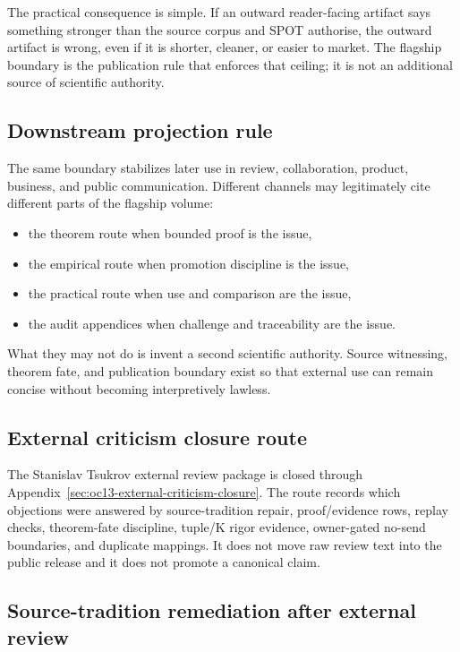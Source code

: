 The practical consequence is simple. If an outward reader-facing artifact says
something stronger than the source corpus and SPOT authorise, the outward
artifact is wrong, even if it is shorter, cleaner, or easier to market. The
flagship boundary is the publication rule that enforces that ceiling; it is
not an additional source of scientific authority.

\subsection{Downstream projection rule}

The same boundary stabilizes later use in review, collaboration, product,
business, and public communication. Different channels may legitimately cite
different parts of the flagship volume:

\begin{itemize}
\item the theorem route when bounded proof is the issue,
\item the empirical route when promotion discipline is the issue,
\item the practical route when use and comparison are the issue,
\item the audit appendices when challenge and traceability are the issue.
\end{itemize}

What they may not do is invent a second scientific authority. Source witnessing,
theorem fate, and publication boundary exist so that external use can remain
concise without becoming interpretively lawless.

\subsection{External criticism closure route}
\label{sec:oc13-source-audit-external-criticism-closure}

The Stanislav Tsukrov external review package is closed through Appendix~\ref{sec:oc13-external-criticism-closure}. The route records which objections were answered by source-tradition repair, proof/evidence rows, replay checks, theorem-fate discipline, tuple/K rigor evidence, owner-gated no-send boundaries, and duplicate mappings. It does not move raw review text into the public release and it does not promote a canonical claim.

\subsection{Source-tradition remediation after external review}
\label{sec:oc13-source-tradition-remediation-v3}

